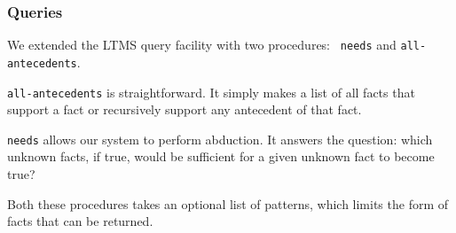 \subsubsection{Queries}

We extended the LTMS query facility with two procedures: {\small\tt
needs} and {\small\tt all-antecedents}. 

{\small\tt all-antecedents} is straightforward. It simply makes a list
of all facts that support a fact or recursively support any antecedent
of that fact.

{\small\tt needs} allows our system to perform abduction. It answers
the question: which unknown facts, if true, would be sufficient for a
given unknown fact to become true?

Both these procedures takes an optional list of patterns, which limits
the form of facts that can be returned.
